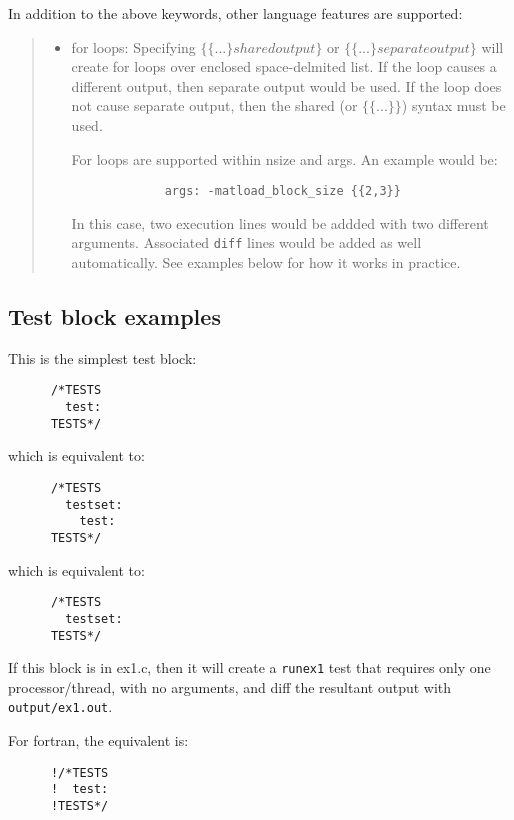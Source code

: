 In addition to the above keywords, other language features are
supported:
%
\begin{quote}
%
\begin{itemize}

\item for loops:  Specifying $\{\{ ... \}shared output\} $ 
      or $\{\{ ... \}separate output\} $ 
      will create for loops over enclosed space-delmited list.  
      If the loop causes a different output, then separate output would
      be used.  If the loop does not cause separate output, then the
      shared (or $\{\{ ... \}\} $) syntax must be used.

For loops are supported within nsize and args.  An example would be:
%
\begin{lstlisting}
             args: -matload_block_size {{2,3}}
\end{lstlisting}

In this case, two execution lines would be addded with two different
arguments.  Associated \lstinline{diff} lines would be added as well
automatically.  See examples below for how it works in practice.

\end{itemize}

\end{quote}


\subsection{Test block examples%
  \label{test-block-examples}%
}

This is the simplest test block:
%
\begin{lstlisting}
      /*TESTS
        test: 
      TESTS*/
\end{lstlisting}
which is equivalent to:
\begin{lstlisting}
      /*TESTS
        testset: 
          test: 
      TESTS*/
\end{lstlisting}
which is equivalent to:
\begin{lstlisting}
      /*TESTS
        testset: 
      TESTS*/
\end{lstlisting}


If this block is in ex1.c, then it will create a \lstinline{runex1} test that
requires only one processor/thread, with no arguments, and diff the
resultant output with \lstinline{output/ex1.out}.

For fortran, the equivalent is:
%
\begin{lstlisting}
      !/*TESTS
      !  test: 
      !TESTS*/
\end{lstlisting}

